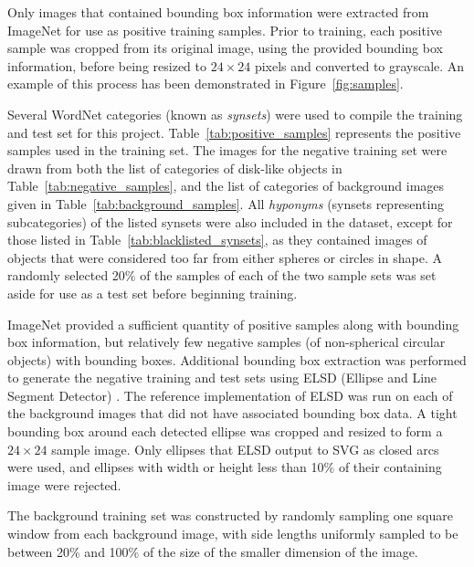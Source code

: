 \documentclass{sig-alternate-05-2015}
\newcommand{\newterm}[1]{{\textit{#1}}}
\newcommand{\citep}[1]{\cite{#1}}
\begin{document}
{{			Only images that contained bounding box information were extracted from ImageNet for use as positive training samples. Prior to training, each positive sample was cropped from its original image, using the provided bounding box information, before being	resized to \(24\times24\) pixels and converted to grayscale. An example of this process has been demonstrated in Figure~\ref{fig:samples}.


			Several WordNet categories (known as \newterm{synsets}) were used to compile the training and test set for this project. Table~\ref{tab:positive_samples} represents the positive samples used in the training set. The images for the negative training set were drawn from both the list of categories of disk-like objects in Table~\ref{tab:negative_samples}, and the list of categories of background images given in Table~\ref{tab:background_samples}.
      All \newterm{hyponyms} (synsets representing subcategories) of the listed synsets were also included in the dataset, except for those listed in Table~\ref{tab:blacklisted_synsets}, as they contained images of objects that were considered too far from either spheres or circles in shape.
      A randomly selected 20\% of the samples of each of the two sample sets was set aside for use as a test set before beginning training.

      ImageNet provided a sufficient quantity of positive samples along with bounding box information, but relatively few negative samples (of non-spherical circular objects) with bounding boxes. Additional bounding box extraction was performed to generate the negative training and test sets using ELSD (Ellipse and Line Segment Detector) \citep{Patraucean:2012jf}. The reference implementation of ELSD was run on each of the background images that did not have associated bounding box data. A tight bounding box around each detected ellipse was cropped and resized to form a \(24\times24\) sample image. Only ellipses that ELSD output to SVG as closed arcs were used, and ellipses with width or height less than 10\% of their containing image were rejected.

      The background training set was constructed by randomly sampling one square window from each background image, with side lengths uniformly sampled to be between 20\% and 100\% of the size of the smaller dimension of the image.

}}
\end{document}
